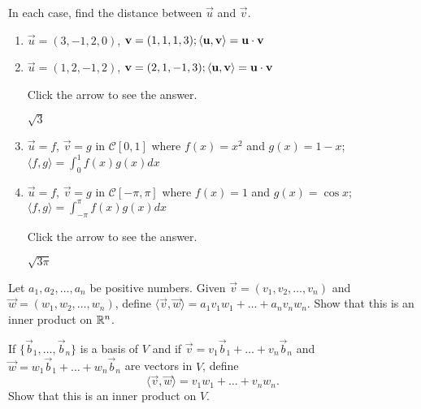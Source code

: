 \documentclass{ximera}
\begin{document}
\begin{problem}\label{prob:inner_prod_4}
In each case, find the distance between $\vec{u}$ and $\vec{v}$.

\begin{enumerate} 
\item $\vec{u} = (3, -1, 2, 0)$, $\mathbf{v} = (1, 1, 1, 3);
\langle \mathbf{u}, \mathbf{v} \rangle = \mathbf{u} \cdot \mathbf{v}$

\item $\vec{u} = (1,  2, -1, 2)$, $\mathbf{v} = (2, 1, -1, 3);
\langle \mathbf{u}, \mathbf{v} \rangle = \mathbf{u} \cdot \mathbf{v}$

Click the arrow to see the answer.
\begin{expandable}
$\sqrt{3}$
\end{expandable}

\item $\vec{u} = f$, $\vec{v} = g $ in $\mathcal{C}[0, 1]$ where $f(x) = x^2 $ and $g(x) = 1 - x$; $\langle f, g \rangle = \int_{0}^{1} f(x)g(x)dx$

\item $\vec{u} = f$, $\vec{v} = g $ in $\mathcal{C}[-\pi, \pi]$ where $f(x) = 1$ and $g(x) = \cos x$; $\langle f, g \rangle = \int_{-\pi}^{\pi} f(x)g(x)dx$

Click the arrow to see the answer.
\begin{expandable}
$\sqrt{3\pi}$
\end{expandable}

\end{enumerate}
\end{problem}

\begin{problem}\label{ex:10_1_5}
Let $a_{1}, a_{2}, \dots, a_{n}$ be positive numbers. Given $\vec{v} = (v_{1}, v_{2}, \dots, v_{n})$ and $\vec{w} = (w_{1}, w_{2}, \dots, w_{n})$, define $\langle\vec{v}, \vec{w}\rangle = a_{1}v_{1}w_{1} + \dots + a_{n}v_{n}w_{n}$. Show that this is an inner product on $\mathbb{R}^n$.
\end{problem}

\begin{problem}\label{prob:inner_prod_6}
If $\{\vec{b}_{1}, \dots, \vec{b}_{n}\}$ is a basis of $V$ and if
$\vec{v} = v_1\vec{b}_1 + \dots + v_n\vec{b}_n$ and
$\vec{w} = w_1\vec{b}_1 + \dots + w_n\vec{b}_n$ are vectors in $V$, define
\begin{equation*}
\langle \vec{v}, \vec{w} \rangle = v_1w_1 + \dots + v_nw_n .
\end{equation*}
Show that this is an inner product on $V$.
\end{problem}
\end{document}
